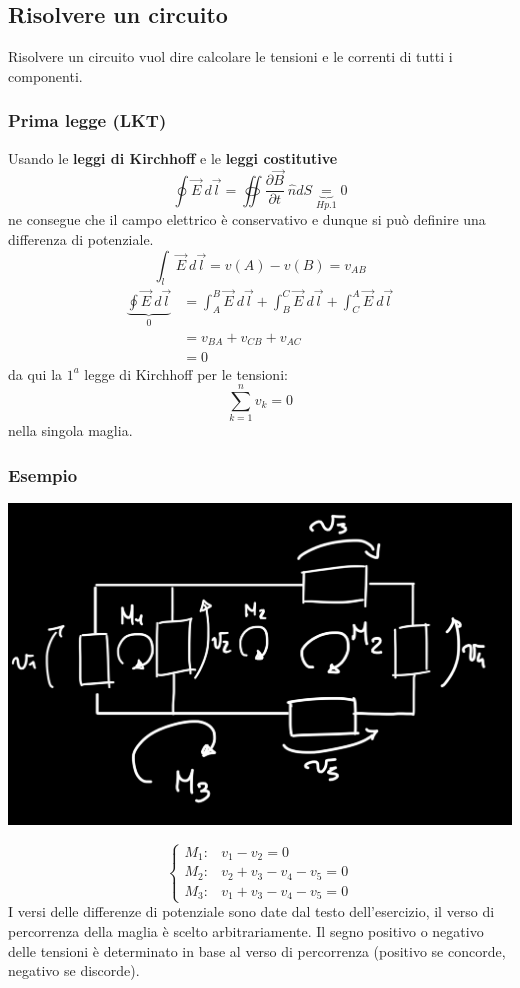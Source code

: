 \documentclass{article}
\begin{document}
\subsection{Risolvere un circuito}
Risolvere un circuito vuol dire calcolare le tensioni e le correnti di tutti i componenti.
\subsubsection{Prima legge (LKT)}
Usando le \textbf{leggi di Kirchhoff} e le \textbf{leggi costitutive}
\[
    \oint \vec E \ d \vec l = \oiint \dfrac{\partial \vec B}{\partial t}\ \hat n dS \underbrace{=}_{Hp.1} 0
\]
ne consegue che il campo elettrico è conservativo e dunque si può definire una differenza di potenziale.
\[
    \int_l \vec E \ d \vec l = v(A) - v(B) = v_{AB}
\]
\begin{align*}
    \underbrace{\oint \vec E \ d \vec l}_{0} &= \int_{A}^{B} \vec E \ d\vec l + \int_{B}^{C} \vec E \ d\vec l + \int_{C}^{A} \vec E \ d\vec l \\
    &= v_{BA}+ v_{CB} + v_{AC} \\
    &= 0
\end{align*}
da qui la $1^a$ legge di Kirchhoff per le tensioni:
\[
    \sum_{k=1}^nv_k=0
\]
nella singola maglia.


\subsubsection*{Esempio}
\begin{center}
    \includegraphics[scale=0.37]{Image/Esempio1-Circuiiti.png}
\end{center}
\[
\begin{cases}
    M_1: & v_1 - v_2 = 0\\
    M_2: & v_2+v_3-v_4-v_5 = 0\\
    M_3: & v_1 + v_3 - v_4 - v_5=0
\end{cases}
\]
I versi delle differenze di potenziale sono date dal testo dell'esercizio, il verso di percorrenza
della maglia è scelto arbitrariamente. Il segno positivo o negativo delle tensioni è determinato in base al verso di percorrenza (positivo se concorde, negativo se discorde).
\end{document}
